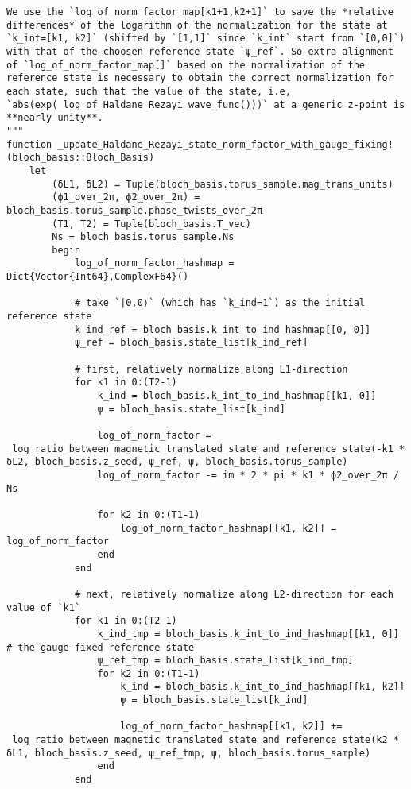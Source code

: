 \begin{verbatim}
We use the `log_of_norm_factor_map[k1+1,k2+1]` to save the *relative differences* of the logarithm of the normalization for the state at `k_int=[k1, k2]` (shifted by `[1,1]` since `k_int` start from `[0,0]`) with that of the choosen reference state `ψ_ref`. So extra alignment of `log_of_norm_factor_map[]` based on the normalization of the reference state is necessary to obtain the correct normalization for each state, such that the value of the state, i.e, `abs(exp(_log_of_Haldane_Rezayi_wave_func()))` at a generic z-point is **nearly unity**.
"""
function _update_Haldane_Rezayi_state_norm_factor_with_gauge_fixing!(bloch_basis::Bloch_Basis)
    let
        (δL1, δL2) = Tuple(bloch_basis.torus_sample.mag_trans_units)
        (ϕ1_over_2π, ϕ2_over_2π) = bloch_basis.torus_sample.phase_twists_over_2π
        (T1, T2) = Tuple(bloch_basis.T_vec)
        Ns = bloch_basis.torus_sample.Ns
        begin
            log_of_norm_factor_hashmap = Dict{Vector{Int64},ComplexF64}()

            # take `|0,0⟩` (which has `k_ind=1`) as the initial reference state
            k_ind_ref = bloch_basis.k_int_to_ind_hashmap[[0, 0]]
            ψ_ref = bloch_basis.state_list[k_ind_ref]

            # first, relatively normalize along L1-direction
            for k1 in 0:(T2-1)
                k_ind = bloch_basis.k_int_to_ind_hashmap[[k1, 0]]
                ψ = bloch_basis.state_list[k_ind]

                log_of_norm_factor = _log_ratio_between_magnetic_translated_state_and_reference_state(-k1 * δL2, bloch_basis.z_seed, ψ_ref, ψ, bloch_basis.torus_sample)
                log_of_norm_factor -= im * 2 * pi * k1 * ϕ2_over_2π / Ns

                for k2 in 0:(T1-1)
                    log_of_norm_factor_hashmap[[k1, k2]] = log_of_norm_factor
                end
            end

            # next, relatively normalize along L2-direction for each value of `k1`
            for k1 in 0:(T2-1)
                k_ind_tmp = bloch_basis.k_int_to_ind_hashmap[[k1, 0]] # the gauge-fixed reference state
                ψ_ref_tmp = bloch_basis.state_list[k_ind_tmp]
                for k2 in 0:(T1-1)
                    k_ind = bloch_basis.k_int_to_ind_hashmap[[k1, k2]]
                    ψ = bloch_basis.state_list[k_ind]

                    log_of_norm_factor_hashmap[[k1, k2]] += _log_ratio_between_magnetic_translated_state_and_reference_state(k2 * δL1, bloch_basis.z_seed, ψ_ref_tmp, ψ, bloch_basis.torus_sample)
                end
            end


\end{verbatim}
